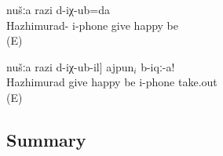 \begin{exe}
	\ex	\label{ex:father an iphone was given}
	\begin{xlist}
		\ex	\label{ex:When an iphone was given to Hazhimurad we got happy}
		nušːa	razi	d-iχ-ub=da\\
		Hazhimurad-	i-phone give		happy	be\\
	\glt	{} (E)

	\ex	\label{ex:‎Give me the i-phone that when it was given to Hazhimurad we got happy.}
	\gll	[[ħaˁžimurad-li-j	\_$_{i}$	b-ičː-ib-le]	nušːa	razi	d-iχ-ub-il]	ajpun$_{i}$	b-iqː-a!\\
		Hazhimurad		give		happy	be	i-phone	take.out\\
	\glt	{} (E)
	\end{xlist}
\end{exe}



\subsection{Summary}
\label{ssec:adverbialclausessummary}

